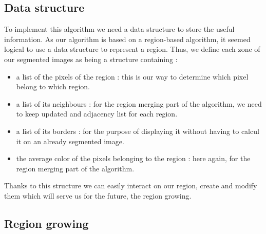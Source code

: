 \documentclass[conference]{IEEEtran}
\begin{document}
\subsection{Data structure}

To implement this algorithm we need a data structure to store the useful information. As our algorithm is based on a region-based algorithm, it seemed logical to use a data structure to represent a region. Thus, we define each zone of our segmented images as being a structure containing :
\begin{itemize}
\item a list of the pixels of the region : this is our way to determine which pixel belong to which region.
\item a list of its neighbours : for the region merging part of the algorithm, we need to keep updated and adjacency list for each region.
\item a list of its borders : for the purpose of displaying it without having to calcul it on an already segmented image.
\item the average color of the pixels belonging to the region : here again, for the region merging part of the algorithm.
\end{itemize}
Thanks to this structure we can easily interact on our region, create and modify them which will serve us for the future, the region growing.

\subsection{Region growing}
\end{document}
